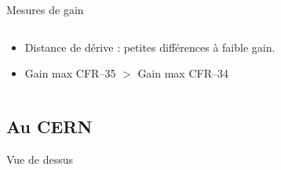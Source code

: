 \begin{frame}{Mesures de gain}
\begin{scriptsize}
\begin{columns}
\begin{column}{0.58\textwidth}
\begin{itemize}
    					\item Distance de dérive : petites différences à faible gain.
    					\item  Gain max CFR--35 $>$ Gain max CFR--34
    				\end{itemize}
    			\end{column}
    		\end{columns}
    	\end{scriptsize}
    \end{frame}
    
    \subsection{Au CERN}

    {
    	\setlength\pdfpagewidth{12.8cm}%
    	\setlength\pdfpageheight{9cm}%
    	\begin{frame}[plain]
    	\end{frame}
    }
    
    {
       	\setlength\pdfpagewidth{12.8cm}%
       	\setlength\pdfpageheight{9cm}%
       	\begin{frame}[plain]
       	 Vue de dessus
       	\end{frame}
    }

